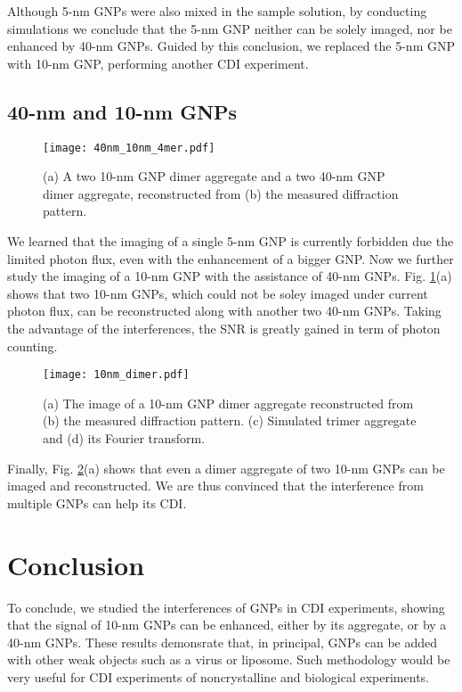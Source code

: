 \documentclass[10pt,letterpaper]{article}
\begin{document}
Although 5-nm GNPs were also mixed in the sample solution, by conducting simulations we conclude that the 5-nm GNP neither can be solely imaged, nor be enhanced by 40-nm GNPs.
Guided by this conclusion, we replaced the 5-nm GNP with 10-nm GNP, performing another CDI experiment.


\subsection{40-nm and 10-nm GNPs}

\begin{figure}
	\texttt{[image: 40nm\_10nm\_4mer.pdf]}%
	\caption{(a) A two 10-nm GNP dimer aggregate and a two 40-nm GNP dimer aggregate, reconstructed from (b) the measured diffraction pattern.}
	\label{fig:40nm_10nm_4mer}
\end{figure}

We learned that the imaging of a single 5-nm GNP is currently forbidden due the limited photon flux, even with the enhancement of a bigger GNP. Now we further study the imaging of a 10-nm GNP with the assistance of 40-nm GNPs. Fig. \ref{fig:40nm_10nm_4mer}(a) shows that two 10-nm GNPs, which could not be soley imaged under current photon flux, can be reconstructed along with another two 40-nm GNPs. 
Taking the advantage of the interferences, the SNR is greatly gained in term of photon counting.

\begin{figure}
	\texttt{[image: 10nm\_dimer.pdf]}%
	\caption{(a) The image of a 10-nm GNP dimer aggregate reconstructed from (b) the measured diffraction pattern. (c) Simulated trimer aggregate and (d) its Fourier transform.}
	\label{fig:10nm_dimer}
\end{figure}

Finally, Fig. \ref{fig:10nm_dimer}(a) shows that even a dimer aggregate of two 10-nm GNPs can be imaged and reconstructed.
We are thus convinced that the interference from multiple GNPs can help its CDI.

\section{Conclusion}

To conclude, we studied the interferences of GNPs in CDI experiments, showing that the signal of 10-nm GNPs can be enhanced, either by its aggregate, or by a 40-nm GNPs. 
These results demonsrate that, in principal, GNPs can be added with other weak objects such as a virus or liposome.
Such methodology would be very useful for CDI experiments of noncrystalline and biological experiments.
\end{document}
